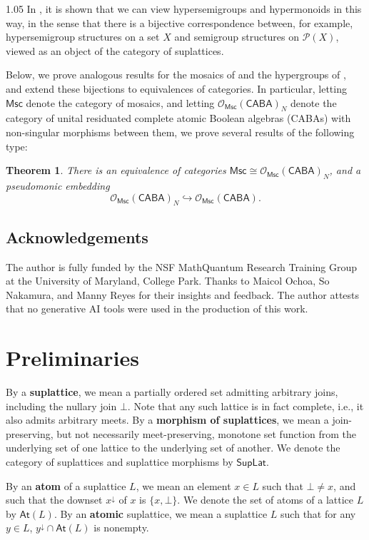 \documentclass[reqno]{amsart}
\newcommand{\pow}{\mathcal{P}}
\newcommand{\cat}{\mathsf}
\numberwithin{equation}{section}
\theoremstyle{plain}
\newtheorem{theorem}[equation]{Theorem}
\theoremstyle{definition}
\begin{document}
\begin{spacing}{1.05}
In \cite[N]{Dudzik_2016}, it is shown that we can view hypersemigroups and hypermonoids in this way, in the sense that there is a bijective correspondence between, for example, hypersemigroup structures on a set $X$ and semigroup structures on $\pow(X)$, viewed as an object of the category of suplattices. 

Below, we prove analogous results for the mosaics of \cite{mosaics} and the hypergroups of \cite{marty}, and extend these bijections to equivalences of categories. In particular, letting $\cat{Msc}$ denote the category of mosaics, and letting $\mathcal{O}_\mathsf{Msc}(\cat{CABA})_N$ denote the category of unital residuated complete atomic Boolean algebras (CABAs) with non-singular morphisms between them, we prove several results of the following type:

\begin{theorem}
    There is an equivalence of categories $\cat{Msc} \cong \mathcal{O}_\mathsf{Msc}(\cat{CABA})_N$, and a pseudomonic embedding $$\mathcal{O}_\mathsf{Msc}(\cat{CABA})_N \hookrightarrow \mathcal{O}_\mathsf{Msc}(\cat{CABA}).$$
\end{theorem}

\subsection{Acknowledgements} The author is fully funded by the NSF MathQuantum Research Training Group at the University of Maryland, College Park. Thanks to Maicol Ochoa, So Nakamura, and Manny Reyes for their insights and feedback. The author attests that no generative AI tools were used in the production of this work.

\section{Preliminaries} By a \textbf{suplattice}, we mean a partially ordered set admitting arbitrary joins, including the nullary join $\bot$. Note that any such lattice is in fact complete, i.e., it also admits arbitrary meets. By a \textbf{morphism of suplattices}, we mean a join-preserving, but not necessarily meet-preserving, monotone set function from the underlying set of one lattice to the underlying set of another. We denote the category of suplattices and suplattice morphisms by $\cat{SupLat}$.

By an \textbf{atom} of a suplattice $L$, we mean an element $x \in L$ such that $\bot \neq x$, and such that the downset $x^\downarrow$ of $x$ is $\{x, \bot\}$. We denote the set of atoms of a lattice $L$ by $\cat{At}(L)$. By an \textbf{atomic} suplattice, we mean a suplattice $L$ such that for any $y \in L$, $y^\downarrow \cap \cat{At}(L)$ is nonempty.


\end{spacing}
\end{document}
